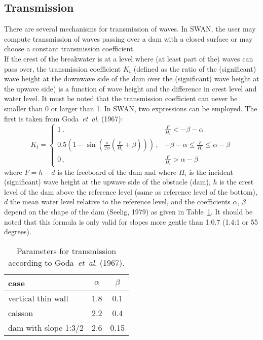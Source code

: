 \documentclass[12pt]{book}
\begin{document}
\subsection{Transmission}

There are several mechanisms for transmission of waves. In SWAN, the user may compute transmission of waves passing
over a dam with a closed surface or may choose a constant transmission coefficient.
\\[2ex]
\noindent
If the crest of the breakwater is at a level
where (at least part of the) waves can pass over, the transmission coefficient $K_{t}$ (defined as the ratio of
the (significant) wave height at the downwave side of the dam over the (significant) wave height at the
upwave side) is a function of wave height and the difference in crest level and water level. It must be noted that
the transmission coefficient can never be smaller than 0 or larger than 1. In SWAN, two expressions
can be employed. The first is taken from Goda~{\it et~al}. (1967):
\begin{equation}
  K_t =
    \left\{
      \begin{array}{ll}
         1 \, , & \frac{F}{H_i} < -\beta - \alpha \\
         0.5 (1 - \sin(\frac{\pi}{2\alpha}(\frac{F}{H_i}+\beta)))\, , & -\beta -\alpha \leq \frac{F}{H_i} \leq \alpha - \beta \\
         0 \, , & \frac{F}{H_i} > \alpha - \beta
      \end{array}
    \right.
  \label{eq2-9}
\end{equation}
where $F=h-d$ is the freeboard of the dam and where $H_i$ is the incident (significant) wave height at the
upwave side of the obstacle (dam), $h$ is the crest level of the dam above the reference level (same as
reference level of the bottom), $d$ the mean water level relative to the reference level, and the coefficients
$\alpha$, $\beta$ depend on the shape of the dam (Seelig, 1979) as given in Table~\ref{tab:see79}. It should be
noted that this formula is only valid for slopes more gentle than 1:0.7 (1.4:1 or 55 degrees).
\begin{table}[htb]
\begin{center}
\caption{Parameters for transmission according to Goda~{\it et~al}. (1967).}
\label{tab:see79}
\begin{tabular}{l c c}
\hline
  case & $\alpha$ & $\beta$ \\
\hline
    vertical thin wall   & 1.8 & 0.1  \\
    caisson              & 2.2 & 0.4  \\
    dam with slope 1:3/2 & 2.6 & 0.15 \\
\hline
\end{tabular}
\end{center}
\end{table}
\end{document}
